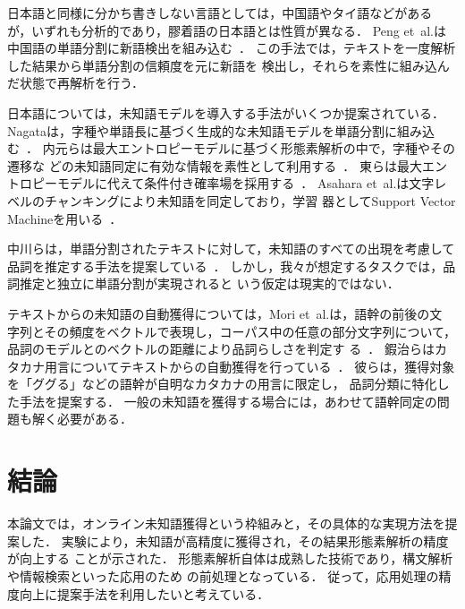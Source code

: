 \documentclass[japanese]{jnlp_1.4}
\begin{document}
日本語と同様に分かち書きしない言語としては，中国語やタイ語などがある
が，いずれも分析的であり，膠着語の日本語とは性質が異なる．
Peng et~al.は中国語の単語分割に新語検出を組み込む~\cite{Peng2004full}．
この手法では，テキストを一度解析した結果から単語分割の信頼度を元に新語を
検出し，それらを素性に組み込んだ状態で再解析を行う．

日本語については，未知語モデルを導入する手法がいくつか提案されている．
Nagataは，字種や単語長に基づく生成的な未知語モデルを単語分割に組み込
む~\cite{Nagata1999full}．
内元らは最大エントロピーモデルに基づく形態素解析の中で，字種やその遷移な
どの未知語同定に有効な情報を素性として利用する~\cite{内元清貴:2001}．
東らは最大エントロピーモデルに代えて条件付き確率場を採用する~\cite{東
藍:2006}．
Asahara et~al.は文字レベルのチャンキングにより未知語を同定しており，学習
器としてSupport Vector Machineを用いる~\cite{Asahara2004full}．

中川らは，単語分割されたテキストに対して，未知語のすべての出現を考慮して
品詞を推定する手法を提案している~\cite{中川哲治:2008}．
しかし，我々が想定するタスクでは，品詞推定と独立に単語分割が実現されると
いう仮定は現実的ではない．

テキストからの未知語の自動獲得については，Mori et~al.は，語幹の前後の文
字列とその頻度をベクトルで表現し，コーパス中の任意の部分文字列について，
品詞のモデルとのベクトルの距離により品詞らしさを判定す
る~\cite{Mori1996full}．
鍜治らはカタカナ用言についてテキストからの自動獲得を行っている~\cite{鍜
治伸裕:2009}．
彼らは，獲得対象を「ググる」などの語幹が自明なカタカナの用言に限定し，
品詞分類に特化した手法を提案する．
一般の未知語を獲得する場合には，あわせて語幹同定の問題も解く必要がある．



\section{結論} \label{sec:conclusion}

本論文では，オンライン未知語獲得という枠組みと，その具体的な実現方法を提
案した．
実験により，未知語が高精度に獲得され，その結果形態素解析の精度が向上する
ことが示された．
形態素解析自体は成熟した技術であり，構文解析や情報検索といった応用のため
の前処理となっている．
従って，応用処理の精度向上に提案手法を利用したいと考えている．
\end{document}

